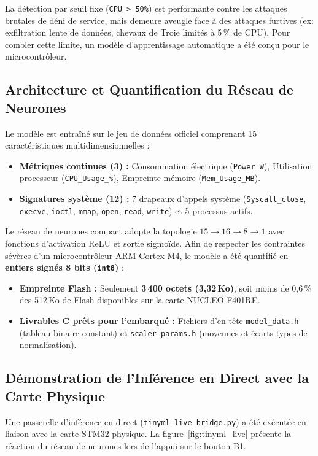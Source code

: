 \documentclass[a4paper,11pt]{article}
\begin{document}
La détection par seuil fixe (\texttt{CPU > 50\%}) est performante contre les attaques brutales de déni de service, mais demeure aveugle face à des attaques furtives (ex: exfiltration lente de données, chevaux de Troie limités à 5\,\% de CPU). Pour combler cette limite, un modèle d'apprentissage automatique a été conçu pour le microcontrôleur.

\subsection{Architecture et Quantification du Réseau de Neurones}

Le modèle est entraîné sur le jeu de données officiel comprenant 15 caractéristiques multidimensionnelles :
\begin{itemize}[leftmargin=1.5em]
  \item \textbf{Métriques continues (3) :} Consommation électrique (\texttt{Power\_W}), Utilisation processeur (\texttt{CPU\_Usage\_\%}), Empreinte mémoire (\texttt{Mem\_Usage\_MB}).
  \item \textbf{Signatures système (12) :} 7 drapeaux d'appels système (\texttt{Syscall\_close}, \texttt{execve}, \texttt{ioctl}, \texttt{mmap}, \texttt{open}, \texttt{read}, \texttt{write}) et 5 processus actifs.
\end{itemize}

Le réseau de neurones compact adopte la topologie $15 \to 16 \to 8 \to 1$ avec fonctions d'activation ReLU et sortie sigmoïde. Afin de respecter les contraintes sévères d'un microcontrôleur ARM Cortex-M4, le modèle a été quantifié en \textbf{entiers signés 8 bits (\texttt{int8})} :
\begin{itemize}[leftmargin=1.5em]
  \item \textbf{Empreinte Flash :} Seulement \textbf{3\,400 octets (3,32\,Ko)}, soit moins de 0,6\,\% des 512\,Ko de Flash disponibles sur la carte NUCLEO-F401RE.
  \item \textbf{Livrables C prêts pour l'embarqué :} Fichiers d'en-tête \texttt{model\_data.h} (tableau binaire constant) et \texttt{scaler\_params.h} (moyennes et écarts-types de normalisation).
\end{itemize}

\subsection{Démonstration de l'Inférence en Direct avec la Carte Physique}

Une passerelle d'inférence en direct (\texttt{tinyml\_live\_bridge.py}) a été exécutée en liaison avec la carte STM32 physique. La figure~\ref{fig:tinyml_live} présente la réaction du réseau de neurones lors de l'appui sur le bouton B1.
\end{document}
